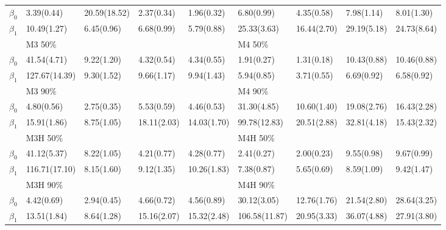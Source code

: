 \documentclass[12pt]{article}
\begin{document}
\begin{center}
\begin{table}[h]
\begin{tabular}[tb]{c|llll|llll}
      $\beta_0$ & 3.39(0.44)    & 20.59(18.52) & 2.37(0.34)  & 1.96(0.32)  & 6.80(0.99)    & 4.35(0.58)  & 7.98(1.14)  & 8.01(1.30)  \\
      $\beta_1$ & 10.49(1.27)   & 6.45(0.96)   & 6.68(0.99)  & 5.79(0.88)  & 25.33(3.63)   & 16.44(2.70) & 29.19(5.18) & 24.73(8.64) \\
      \hline
      & M3 50\%       &              &             &             & M4 50\%       &             &             &             \\
      $\beta_0$ & 41.54(4.71)   & 9.22(1.20)   & 4.32(0.54)  & 4.34(0.55)  & 1.91(0.27)    & 1.31(0.18)  & 10.43(0.88) & 10.46(0.88) \\
      $\beta_1$ & 127.67(14.39) & 9.30(1.52)   & 9.66(1.17)  & 9.94(1.43)  & 5.94(0.85)    & 3.71(0.55)  & 6.69(0.92)  & 6.58(0.92)  \\
      & M3 90\%       &              &             &             & M4 90\%       &             &             &             \\
      $\beta_0$ & 4.80(0.56)    & 2.75(0.35)   & 5.53(0.59)  & 4.46(0.53)  & 31.30(4.85)   & 10.60(1.40) & 19.08(2.76) & 16.43(2.28) \\
      $\beta_1$ & 15.91(1.86)   & 8.75(1.05)   & 18.11(2.03) & 14.03(1.70) & 99.78(12.83)  & 20.51(2.88) & 32.81(4.18) & 15.43(2.32) \\
      \hline
      & M3H 50\%       &              &             &             & M4H 50\%       &             &             &             \\
      $\beta_0$ & 41.12(5.37)   & 8.22(1.05)   & 4.21(0.77)  & 4.28(0.77)  & 2.41(0.27)    & 2.00(0.23)  & 9.55(0.98)  & 9.67(0.99)  \\
      $\beta_1$ & 116.71(17.10) & 8.15(1.60)   & 9.12(1.35)  & 10.26(1.83) & 7.38(0.87)    & 5.65(0.69)  & 8.59(1.09)  & 9.42(1.47)  \\
      & M3H 90\%       &              &             &             & M4H 90\%       &             &             &             \\
      $\beta_0$ & 4.42(0.69)    & 2.94(0.45)   & 4.66(0.72)  & 4.56(0.89)  & 30.12(3.05)   & 12.76(1.76) & 21.54(2.80) & 28.64(3.25) \\
      $\beta_1$ & 13.51(1.84)   & 8.64(1.28)   & 15.16(2.07) & 15.32(2.48) & 106.58(11.87) & 20.95(3.33) & 36.07(4.88) & 27.91(3.80) \\
      \hline
    \end{tabular}
    \label{tab:m1}
  \end{table}
\end{center}
\end{document}
